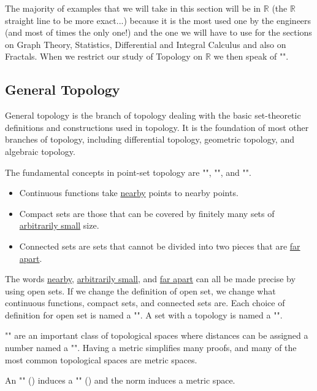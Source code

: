 	The majority of examples that we will take in this section will be in $\mathbb{R}$ (the $\mathbb{R}$ straight line to be more exact...) because it is the most used one by the engineers (and most of times the only one!) and the one we will have to use for the sections on Graph Theory, Statistics, Differential and Integral Calculus and also on Fractals. When we restrict our study of Topology on $\mathbb{R}$ we then speak of "".

	\subsection{General Topology}

General topology is the branch of topology dealing with the basic set-theoretic definitions and constructions used in topology. It is the foundation of most other branches of topology, including differential topology, geometric topology, and algebraic topology.

The fundamental concepts in point-set topology are "", "", and "".  
	\begin{itemize}
		\item Continuous functions take \underline{nearby} points to nearby points.
		\item Compact sets are those that can be covered by finitely many sets of \underline{arbitrarily small} size. 
		\item Connected sets are sets that cannot be divided into two pieces that are \underline{far apart}. 
	\end{itemize}		
	The words \underline{nearby}, \underline{arbitrarily small}, and \underline{far apart} can all be made precise by using open sets. If we change the definition of open set, we change what continuous functions, compact sets, and connected sets are. Each choice of definition for open set is named a "". A set with a topology is named a "".

	"" are an important class of topological spaces where distances can be assigned a number named a "". Having a metric simplifies many proofs, and many of the most common topological spaces are metric spaces.
	
	An "" () induces a ""  () and the norm induces a metric space. 
	
